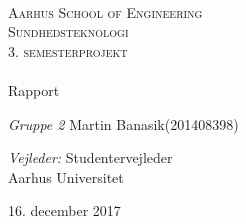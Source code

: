 
\begin{titlingpage}
\begin{center}

~ \\[3cm]


\textsc{\LARGE Aarhus School of Engineering}\\[1.5cm]

\textsc{\Large Sundhedsteknologi}\\
\textsc{\Large 3. semesterprojekt}\\[0.5cm]

\noindent\makebox[\linewidth]{\rule{\textwidth}{0.4pt}}\\
[0.5cm]{\Huge Rapport}
\noindent\makebox[\linewidth]{\rule{\textwidth}{0.4pt}}

\end{center}



\textit{Gruppe 2} \newline
Martin Banasik\tab(201408398) \newline	





\textit{Vejleder:} \newline
Studentervejleder\\

Aarhus Universitet


\vfill

\begin{center}
{\large 16. december 2017}
\end{center}


\end{titlingpage}